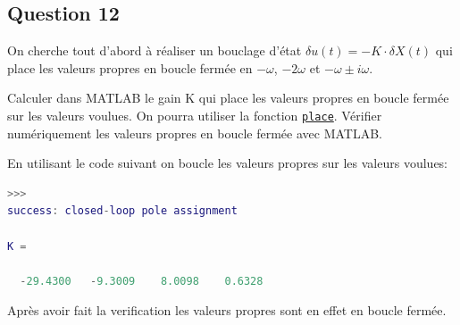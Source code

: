 \documentclass[class=article, crop=false]{standalone}
\begin{document}
\newpage
\subsection{Question 12}
On cherche tout d'abord à réaliser un bouclage d'état $\delta u(t) = - K \cdot \delta X(t)$ qui place les valeurs propres en boucle fermée en $-\omega$, $-2\omega$ et $-\omega \pm i\omega$.
\begin{exercise}
    Calculer dans MATLAB le gain K qui place les valeurs propres en boucle fermée sur les valeurs voulues. On pourra utiliser la fonction \href{https://www.mathworks.com/help/control/ref/place.html}{\texttt{place}}. Vérifier numériquement les valeurs propres en boucle fermée avec MATLAB.
\end{exercise}
\begin{resolution}
    En utilisant le code suivant on boucle les valeurs propres sur les valeurs voulues:
    \begin{scriptsize}\mycode
        
    \end{scriptsize}
    \begin{scriptsize}\mycode
        \begin{lstlisting}[language=Matlab]
>>>
success: closed-loop pole assignment

K =

  -29.4300   -9.3009    8.0098    0.6328
        \end{lstlisting}
    \end{scriptsize}
    Après avoir fait la verification les valeurs propres sont en effet en boucle fermée.
\end{resolution}

\newpage
\end{document}
